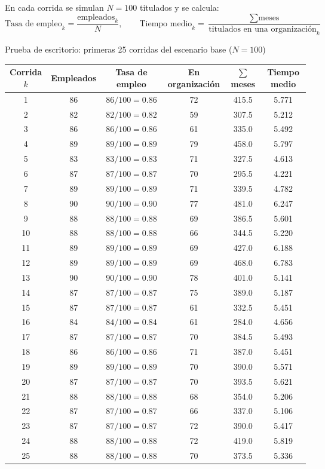 En cada corrida se simulan $N = 100$ titulados y se calcula:
\[
\text{Tasa de empleo}_k = \frac{\text{empleados}_k}{N}, \qquad \text{Tiempo medio}_k = \frac{\sum \text{meses}}{\text{titulados en una organización}_k}
\]

\begin{mitabla}{Prueba de escritorio: primeras 25 corridas del escenario base ($N=100$) \datosprueba}
\begin{tabular}{cccccc}
\toprule
Corrida $k$ & Empleados & Tasa de empleo & En organización & $\sum$ meses & Tiempo medio \\
\midrule
1 & 86 & $86/100 = 0.86$ & 72 & 415.5 & 5.771 \\
2 & 82 & $82/100 = 0.82$ & 59 & 307.5 & 5.212 \\
3 & 86 & $86/100 = 0.86$ & 61 & 335.0 & 5.492 \\
4 & 89 & $89/100 = 0.89$ & 79 & 458.0 & 5.797 \\
5 & 83 & $83/100 = 0.83$ & 71 & 327.5 & 4.613 \\
6 & 87 & $87/100 = 0.87$ & 70 & 295.5 & 4.221 \\
7 & 89 & $89/100 = 0.89$ & 71 & 339.5 & 4.782 \\
8 & 90 & $90/100 = 0.90$ & 77 & 481.0 & 6.247 \\
9 & 88 & $88/100 = 0.88$ & 69 & 386.5 & 5.601 \\
10 & 88 & $88/100 = 0.88$ & 66 & 344.5 & 5.220 \\
11 & 89 & $89/100 = 0.89$ & 69 & 427.0 & 6.188 \\
12 & 89 & $89/100 = 0.89$ & 69 & 468.0 & 6.783 \\
13 & 90 & $90/100 = 0.90$ & 78 & 401.0 & 5.141 \\
14 & 87 & $87/100 = 0.87$ & 75 & 389.0 & 5.187 \\
15 & 87 & $87/100 = 0.87$ & 61 & 332.5 & 5.451 \\
16 & 84 & $84/100 = 0.84$ & 61 & 284.0 & 4.656 \\
17 & 87 & $87/100 = 0.87$ & 70 & 384.5 & 5.493 \\
18 & 86 & $86/100 = 0.86$ & 71 & 387.0 & 5.451 \\
19 & 89 & $89/100 = 0.89$ & 70 & 390.0 & 5.571 \\
20 & 87 & $87/100 = 0.87$ & 70 & 393.5 & 5.621 \\
21 & 88 & $88/100 = 0.88$ & 68 & 354.0 & 5.206 \\
22 & 87 & $87/100 = 0.87$ & 66 & 337.0 & 5.106 \\
23 & 87 & $87/100 = 0.87$ & 72 & 390.0 & 5.417 \\
24 & 88 & $88/100 = 0.88$ & 72 & 419.0 & 5.819 \\
25 & 88 & $88/100 = 0.88$ & 70 & 373.5 & 5.336 \\
\bottomrule
\end{tabular}
\end{mitabla}

